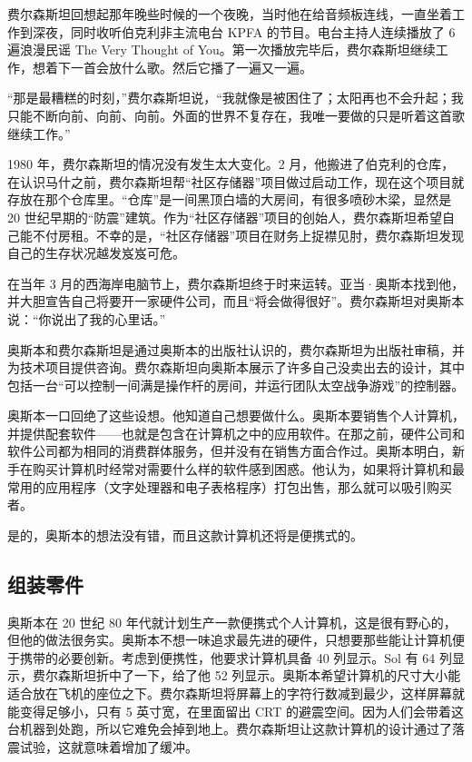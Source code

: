 \documentclass[12pt,UTF8]{ctexbook}
\begin{document}
费尔森斯坦回想起那年晚些时候的一个夜晚，当时他在给音频板连线，一直坐着工作到深夜，同时收听伯克利非主流电台 KPFA 的节目。电台主持人连续播放了 6 遍浪漫民谣 The Very Thought of You。第一次播放完毕后，费尔森斯坦继续工作，想着下一首会放什么歌。然后它播了一遍又一遍。

“那是最糟糕的时刻，”费尔森斯坦说，“我就像是被困住了；太阳再也不会升起；我只能不断向前、向前、向前。外面的世界不复存在，我唯一要做的只是听着这首歌继续工作。”

1980 年，费尔森斯坦的情况没有发生太大变化。2 月，他搬进了伯克利的仓库，在认识马什之前，费尔森斯坦帮“社区存储器”项目做过启动工作，现在这个项目就存放在那个仓库里。“仓库”是一间黑顶白墙的大房间，有很多喷砂木梁，显然是 20 世纪早期的“防震”建筑。作为“社区存储器”项目的创始人，费尔森斯坦希望自己能不付房租。不幸的是，“社区存储器”项目在财务上捉襟见肘，费尔森斯坦发现自己的生存状况越发岌岌可危。

在当年 3 月的西海岸电脑节上，费尔森斯坦终于时来运转。亚当·奥斯本找到他，并大胆宣告自己将要开一家硬件公司，而且“将会做得很好”。费尔森斯坦对奥斯本说：“你说出了我的心里话。”

奥斯本和费尔森斯坦是通过奥斯本的出版社认识的，费尔森斯坦为出版社审稿，并为技术项目提供咨询。费尔森斯坦向奥斯本展示了许多自己没卖出去的设计，其中包括一台“可以控制一间满是操作杆的房间，并运行团队太空战争游戏”的控制器。

奥斯本一口回绝了这些设想。他知道自己想要做什么。奥斯本要销售个人计算机，并提供配套软件——也就是包含在计算机之中的应用软件。在那之前，硬件公司和软件公司都为相同的消费群体服务，但并没有在销售方面合作过。奥斯本明白，新手在购买计算机时经常对需要什么样的软件感到困惑。他认为，如果将计算机和最常用的应用程序（文字处理器和电子表格程序）打包出售，那么就可以吸引购买者。

是的，奥斯本的想法没有错，而且这款计算机还将是便携式的。





\subsection{组装零件}


奥斯本在 20 世纪 80 年代就计划生产一款便携式个人计算机，这是很有野心的，但他的做法很务实。奥斯本不想一味追求最先进的硬件，只想要那些能让计算机便于携带的必要创新。考虑到便携性，他要求计算机具备 40 列显示。Sol 有 64 列显示，费尔森斯坦折中了一下，给了他 52 列显示。奥斯本希望计算机的尺寸大小能适合放在飞机的座位之下。费尔森斯坦将屏幕上的字符行数减到最少，这样屏幕就能变得足够小，只有 5 英寸宽，在里面留出 CRT 的避震空间。因为人们会带着这台机器到处跑，所以它难免会掉到地上。费尔森斯坦让这款计算机的设计通过了落震试验，这就意味着增加了缓冲。
\end{document}
